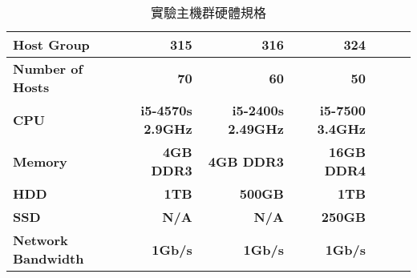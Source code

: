 \begin{table}[htbp]
\centering
\caption{實驗主機群硬體規格}
\label{pcspec}
\begin{adjustbox}{max width=0.92\textwidth}
\begin{tabular}{lrrrrrr}

\toprule
\multicolumn{1}{l}{\textbf{Host Group}} & \textbf{315} & \textbf{316} & \textbf{324} \\ \midrule
\multicolumn{1}{l}{\textbf{Number of Hosts}} & \textbf{70} & \textbf{60} & \textbf{50} \\

\multicolumn{1}{l}{\textbf{CPU}} & \textbf{i5-4570s 2.9GHz} & \textbf{i5-2400s 2.49GHz} & \textbf{i5-7500 3.4GHz} \\

\multicolumn{1}{l}{\textbf{Memory}} & \textbf{4GB DDR3} & \textbf{4GB DDR3} & \textbf{16GB DDR4} \\

\multicolumn{1}{l}{\textbf{HDD}} & \textbf{1TB} & \textbf{500GB} & \textbf{1TB} \\

\multicolumn{1}{l}{\textbf{SSD}} & \textbf{N/A} & \textbf{N/A} & \textbf{250GB} \\

\multicolumn{1}{l}{\textbf{Network Bandwidth}} & \textbf{1Gb/s} & \textbf{1Gb/s} & \textbf{1Gb/s} \\
\bottomrule
\end{tabular}
\end{adjustbox}
\end{table}
